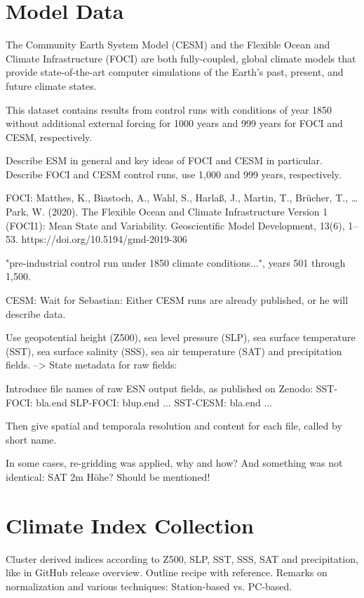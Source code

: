 \documentclass{CUP-JNL-DTM}%
\theoremstyle{definition}
\numberwithin{equation}{section}
\begin{document}
\section{Model Data \label{sec:Model_Data}}

The Community Earth System Model (CESM) and the Flexible Ocean and Climate Infrastructure (FOCI) are both fully-coupled, global climate models that provide state-of-the-art computer simulations of the Earth's past, present, and future climate states.

This dataset contains results from control runs with conditions of year 1850 without additional external forcing for 1000 years and 999 years for FOCI and CESM, respectively.

Describe ESM in general and key ideas of FOCI and CESM in particular. Describe FOCI and CESM control runs, use 1,000 and 999 years, respectively.

FOCI:
Matthes, K., Biastoch, A., Wahl, S., Harlaß, J., Martin, T., Brücher, T., … Park, W. (2020). The Flexible Ocean and Climate Infrastructure Version 1 (FOCI1): Mean State and Variability. Geoscientific Model Development, 13(6), 1–53. https://doi.org/10.5194/gmd-2019-306

"pre-industrial control run under 1850 climate conditions...", years 501 through 1,500.

CESM:
Wait for Sebastian: Either CESM runs are already published, or he will describe data.

Use geopotential height (Z500), sea level pressure (SLP), sea surface temperature (SST), sea surface salinity (SSS), sea air temperature (SAT) and precipitation fields. 
--> State metadata for raw fields:

Introduce file names of raw ESN output fields, as published on Zenodo:
SST-FOCI: bla.end
SLP-FOCI: blup.end
...
SST-CESM: bla.end
...

Then give spatial and temporala resolution and content for each file, called by short name.

In some cases, re-gridding was applied, why and how?
And something was not identical: SAT 2m Höhe? Should be mentioned!

\section{Climate Index Collection \label{sec:Climate_Index_Collection}}

Cluster derived indices according to Z500, SLP, SST, SSS, SAT and precipitation, like in GitHub release overview. Outline recipe with reference. Remarks on normalization and various techniques: Station-based vs. PC-based.
\end{document}
